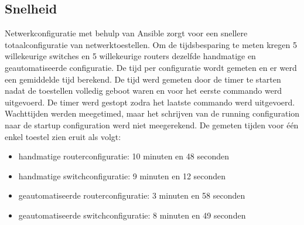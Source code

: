 \subsection{Snelheid}
Netwerkconfiguratie met behulp van Ansible zorgt voor een snellere totaalconfiguratie van netwerktoestellen.
Om de tijdsbesparing te meten kregen 5 willekeurige switches en 5 willekeurige routers dezelfde handmatige en geautomatiseerde configuratie. De tijd per configuratie wordt gemeten en er werd een gemiddelde tijd berekend.
De tijd werd gemeten door de timer te starten nadat de toestellen volledig geboot waren en voor het eerste commando werd uitgevoerd. De timer werd gestopt zodra het laatste commando werd uitgevoerd. Wachttijden werden meegetimed, maar het schrijven van de running configuration naar de startup configuration werd niet meegerekend.
De gemeten tijden voor één enkel toestel zien eruit als volgt:
\begin{itemize}
    \item handmatige routerconfiguratie: 10 minuten en 48 seconden
    \item handmatige switchconfiguratie: 9 minuten en 12 seconden
    \item geautomatiseerde routerconfiguratie: 3 minuten en 58 seconden
    \item geautomatiseerde switchconfiguratie: 8 minuten en 49 seconden
\end{itemize}

